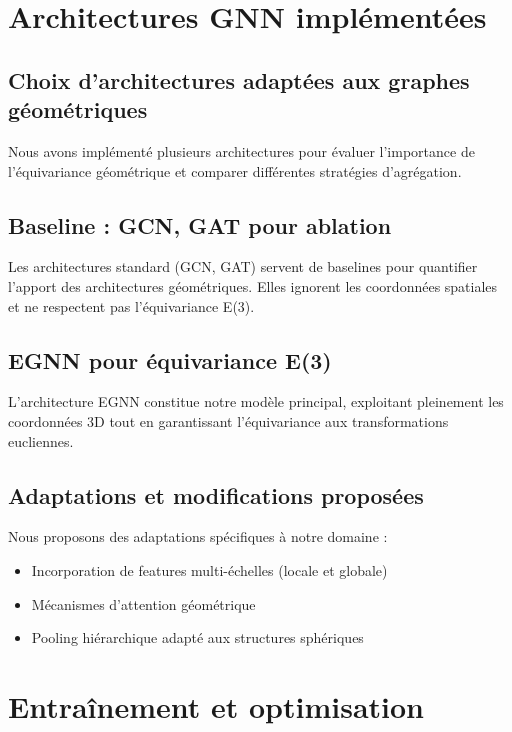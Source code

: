 \section{Architectures GNN implémentées}

\subsection{Choix d'architectures adaptées aux graphes géométriques}

Nous avons implémenté plusieurs architectures pour évaluer l'importance de l'équivariance géométrique et comparer différentes stratégies d'agrégation.

\subsection{Baseline : GCN, GAT pour ablation}

Les architectures standard (GCN, GAT) servent de baselines pour quantifier l'apport des architectures géométriques. Elles ignorent les coordonnées spatiales et ne respectent pas l'équivariance E(3).

\subsection{EGNN pour équivariance E(3)}

L'architecture EGNN constitue notre modèle principal, exploitant pleinement les coordonnées 3D tout en garantissant l'équivariance aux transformations eucliennes.

\subsection{Adaptations et modifications proposées}

Nous proposons des adaptations spécifiques à notre domaine :
\begin{itemize}
    \item Incorporation de features multi-échelles (locale et globale)
    \item Mécanismes d'attention géométrique
    \item Pooling hiérarchique adapté aux structures sphériques
\end{itemize}

\section{Entraînement et optimisation}

